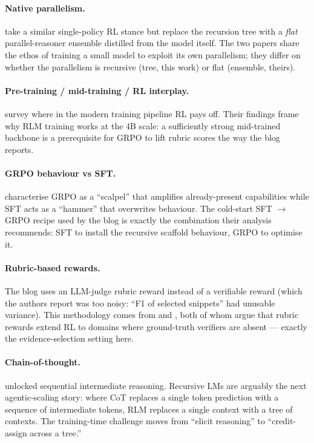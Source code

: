 \documentclass[11pt]{article}
\begin{document}
\paragraph{Native parallelism.}
\citet{wu2025parallel} take a similar single-policy RL stance but replace the
recursion tree with a \emph{flat} parallel-reasoner ensemble distilled from the
model itself. The two papers share the ethos of training a small model to
exploit its own parallelism; they differ on whether the parallelism is
recursive (tree, this work) or flat (ensemble, theirs).

\paragraph{Pre-training / mid-training / RL interplay.}
\citet{zhang2025interplay} survey where in the modern training pipeline RL pays
off. Their findings frame why RLM training works at the 4B scale: a sufficiently
strong mid-trained backbone is a prerequisite for GRPO to lift rubric scores
the way the blog reports.

\paragraph{GRPO behaviour vs SFT.}
\citet{rajani2025grpo} characterise GRPO as a ``scalpel'' that amplifies
already-present capabilities while SFT acts as a ``hammer'' that overwrites
behaviour. The cold-start SFT $\to$ GRPO recipe used by the blog is exactly the
combination their analysis recommends: SFT to install the recursive scaffold
behaviour, GRPO to optimise it.

\paragraph{Rubric-based rewards.}
The blog uses an LLM-judge rubric reward instead of a verifiable reward (which
the authors report was too noisy: ``F1 of selected snippets'' had unusable
variance). This methodology comes from \citet{gunjal2025rubrics} and
\citet{yuan2025rubric}, both of whom argue that rubric rewards extend RL to
domains where ground-truth verifiers are absent --- exactly the
evidence-selection setting here.

\paragraph{Chain-of-thought.}
\citet{wei2022cot} unlocked sequential intermediate reasoning. Recursive LMs
are arguably the next agentic-scaling story: where CoT replaces a single token
prediction with a sequence of intermediate tokens, RLM replaces a single
context with a tree of contexts. The training-time challenge moves from
``elicit reasoning'' to ``credit-assign across a tree.''
\end{document}
